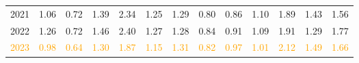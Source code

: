 \documentclass[
]{article}
\begin{document}
\begin{table}
\begin{tabular}[t]{rrrrrrrrrrrrr}
2021 & 1.06 & 0.72 & 1.39 & 2.34 & 1.25 & 1.29 & 0.80 & 0.86 & 1.10 & 1.89 & 1.43 & 1.56\\
2022 & 1.26 & 0.72 & 1.46 & 2.40 & 1.27 & 1.28 & 0.84 & 0.91 & 1.09 & 1.91 & 1.29 & 1.77\\
\textcolor{orange}{2023} & \textcolor{orange}{0.98} & \textcolor{orange}{0.64} & \textcolor{orange}{1.30} & \textcolor{orange}{1.87} & \textcolor{orange}{1.15} & \textcolor{orange}{1.31} & \textcolor{orange}{0.82} & \textcolor{orange}{0.97} & \textcolor{orange}{1.01} & \textcolor{orange}{2.12} & \textcolor{orange}{1.49} & \textcolor{orange}{1.66}\\
\bottomrule
\end{tabular}
\end{table}
\end{document}
